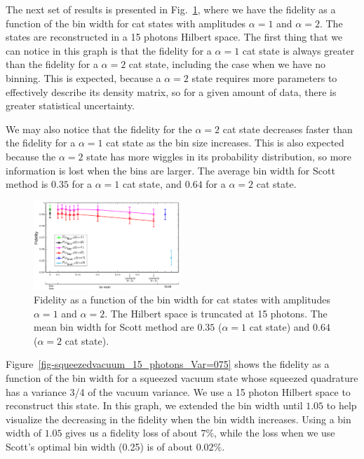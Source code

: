\documentclass[
reprint,
superscriptaddress,
showpacs,
amsmath,
amssymb,
aps,
pra,
longbibliography
]{revtex4-1}
\begin{document}


The next set of results is presented in Fig.~\ref{fig-fidelity_vs_binwidth_15_photons_catstate}, where we have the fidelity as a function
of the bin width for cat states with amplitudes $\alpha=1$ and $\alpha=2$. The states are reconstructed in a 15 photons Hilbert space. The first thing that we can
notice in this graph is that the fidelity for a $\alpha=1$ cat state is always greater than the fidelity for a $\alpha=2$ cat state, including the case when we
have no binning. This is expected, because a $\alpha = 2$ state requires more parameters to effectively describe its density matrix, so for a given amount of data, there is greater statistical uncertainty. 

We may also notice that the fidelity for the $\alpha = 2$ cat state decreases faster than the fidelity for a $\alpha=1$ cat state as the bin size increases. This is also expected because the $\alpha = 2$ state has more wiggles in its probability distribution, so more information is lost when the bins are larger. The average bin width for Scott method is $0.35$ for a $\alpha=1$ cat state, and $0.64$ for a $\alpha=2$ cat state. 

\begin{figure}[h]
\includegraphics[width=0.49\textwidth]{fidelity_vs_binwidth_15_photons_catstate.eps}
\caption{Fidelity as a function of the bin width for cat states with amplitudes $\alpha=1$ and $\alpha=2$. The Hilbert space is truncated at 15 photons. The mean bin width for Scott method are $0.35$ ($\alpha=1$ cat state) and $0.64$ ($\alpha=2$ cat state).}
\label{fig-fidelity_vs_binwidth_15_photons_catstate}
\end{figure}

Figure~\ref{fig-squeezedvacuum_15_photons_Var=075} shows the fidelity as a function
of the bin width for a squeezed vacuum state whose squeezed quadrature has a variance 3/4 of the vacuum variance.  We use a 15 photon Hilbert space to reconstruct this state. In this graph, we extended the bin width until $1.05$ to help visualize the decreasing in the fidelity when the bin width increases. Using a bin width of $1.05$ gives us a fidelity loss of about $7\%$, while the loss when we use Scott's optimal bin width (0.25) is of about $0.02\%$.
\end{document}
